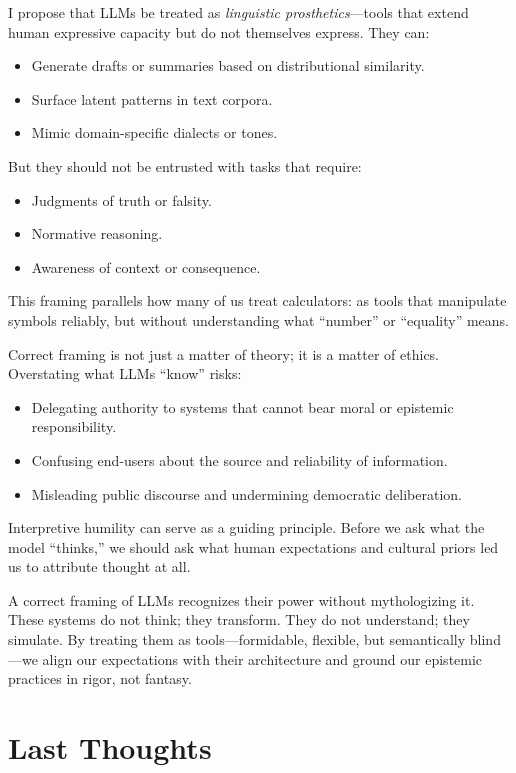 \documentclass[12pt]{article}
\theoremstyle{plain}
\theoremstyle{definition}
\theoremstyle{remark}
\begin{document}
I propose that LLMs be treated as \textit{linguistic prosthetics}—tools that extend human expressive capacity but do not themselves express. They can:
\begin{itemize}
    \item Generate drafts or summaries based on distributional similarity.
    \item Surface latent patterns in text corpora.
    \item Mimic domain-specific dialects or tones.
\end{itemize}
But they should not be entrusted with tasks that require:
\begin{itemize}
    \item Judgments of truth or falsity.
    \item Normative reasoning.
    \item Awareness of context or consequence.
\end{itemize}

This framing parallels how many of us treat calculators: as tools that manipulate symbols reliably, but without understanding what “number” or “equality” means.

Correct framing is not just a matter of theory; it is a matter of ethics. Overstating what LLMs “know” risks:
\begin{itemize}
    \item Delegating authority to systems that cannot bear moral or epistemic responsibility.
    \item Confusing end-users about the source and reliability of information.
    \item Misleading public discourse and undermining democratic deliberation.
\end{itemize}

Interpretive humility can serve as a guiding principle. Before we ask what the model “thinks,” we should ask what human expectations and cultural priors led us to attribute thought at all.

A correct framing of LLMs recognizes their power without mythologizing it. These systems do not think; they transform. They do not understand; they simulate. By treating them as tools—formidable, flexible, but semantically blind—we align our expectations with their architecture and ground our epistemic practices in rigor, not fantasy.

\section{Last Thoughts}
\end{document}
